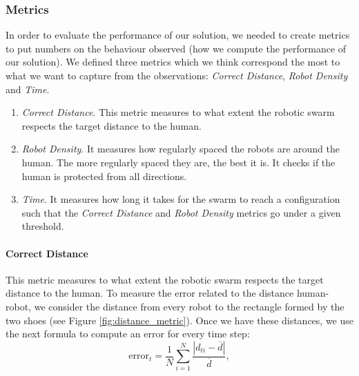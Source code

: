 \documentclass[oneside, a4paper, 12pt]{memoir}
\begin{document}
			\subsubsection{Metrics}
			\label{sec:circle_properties_metrics}

			
			In order to evaluate the performance of our solution, we needed to create metrics to put numbers on the behaviour observed (how we compute the performance of our solution). We defined three metrics which we think correspond the most to what we want to capture from the observations: \emph{Correct Distance}, \emph{Robot Density} and \emph{Time}.
			
			\begin{enumerate}
				\item \emph{Correct Distance}. This metric measures to what extent the robotic swarm respects the target distance to the human.
				\item \emph{Robot Density}. It measures how regularly spaced the robots are around the human. The more regularly spaced they are, the best it is. It checks if the human is protected from all directions.
				\item \emph{Time}. It measures how long it takes for the swarm to reach a configuration such that the \emph{Correct Distance} and \emph{Robot Density} metrics go under a given threshold.
			\end{enumerate}
			
				\paragraph{Correct Distance}

					
					This metric measures to what extent the robotic swarm respects the target distance to the human. To measure the error related to the distance human-robot, we consider the distance from every robot to the rectangle formed by the two shoes (see Figure \ref{fig:distance_metric}). Once we have these distances, we use the next formula to compute an error for every time step:
					\begin{equation}
						\mbox{error}_t = \frac{1}{N} \sum_{i=1}^N \frac{|d_{ti} - \overline{d}|}{\overline{d}},
						\label{eq:distance_metric}
					\end{equation}
					
\end{document}
